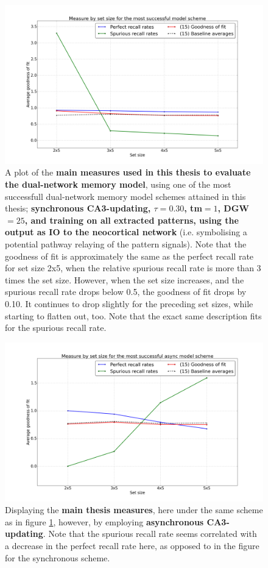 \begin{figure}
    \centering
    \includegraphics[width=14cm]{fig/neo-consolidation/combined-measures-sync}
    \caption{A plot of the \textbf{main measures used in this thesis to evaluate the dual-network memory model}, using one of the most successfull dual-network memory model schemes attained in this thesis; \textbf{synchronous CA3-updating, $\tau=0.30$, tm$=1$, DGW$=25$, and training on all extracted patterns, using the output as IO to the neocortical network} (i.e. symbolising a potential pathway relaying of the pattern signals). Note that the goodness of fit is approximately the same as the perfect recall rate for set size 2x5, when the relative spurious recall rate is more than 3 times the set size. However, when the set size increases, and the spurious recall rate drops below 0.5, the goodness of fit drops by 0.10. It continues to drop slightly for the preceding set sizes, while starting to flatten out, too. Note that the exact same description fits for the spurious recall rate.}
    \label{fig:combined-measures-sync}
\end{figure}

\begin{figure}
    \centering
    \includegraphics[width=14cm]{fig/neo-consolidation/combined-measures-async}
    \caption{Displaying the \textbf{main thesis measures}, here under the same scheme as in figure \ref{fig:combined-measures-sync}, however, by employing \textbf{asynchronous CA3-updating}. Note that the spurious recall rate seems correlated with a decrease in the perfect recall rate here, as opposed to in the figure for the synchronous scheme.}
    \label{fig:combined-measures-async}
\end{figure}

